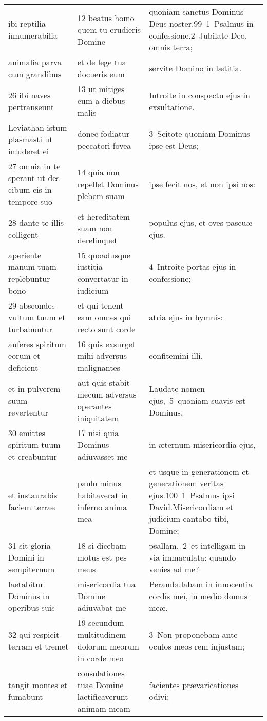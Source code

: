 \documentclass{article}
\begin{document}
\begin{longtable}{@{}p{}p{}p{}@{}}
ibi reptilia innumerabilia	&	12 beatus homo quem tu erudieris Domine	&	quoniam sanctus Dominus Deus noster.99 1 Psalmus in confessione.2 Jubilate Deo, omnis terra;	\\
animalia parva cum grandibus	&	et de lege tua docueris eum	&	servite Domino in lætitia.	\\
26 ibi naves pertranseunt	&	13 ut mitiges eum a diebus malis	&	Introite in conspectu ejus in exsultatione.	\\
Leviathan istum plasmasti ut inluderet ei	&	donec fodiatur peccatori fovea	&	3 Scitote quoniam Dominus ipse est Deus;	\\
27 omnia in te sperant ut des cibum eis in tempore suo	&	14 quia non repellet Dominus plebem suam	&	ipse fecit nos, et non ipsi nos:	\\
28 dante te illis colligent	&	et hereditatem suam non derelinquet	&	populus ejus, et oves pascuæ ejus.	\\
aperiente manum tuam replebuntur bono	&	15 quoadusque iustitia convertatur in iudicium	&	4 Introite portas ejus in confessione;	\\
29 abscondes vultum tuum et turbabuntur	&	et qui tenent eam omnes qui recto sunt corde	&	atria ejus in hymnis:	\\
auferes spiritum eorum et deficient	&	16 quis exsurget mihi adversus malignantes	&	confitemini illi.	\\
et in pulverem suum revertentur	&	aut quis stabit mecum adversus operantes iniquitatem	&	Laudate nomen ejus, 5 quoniam suavis est Dominus,	\\
30 emittes spiritum tuum et creabuntur	&	17 nisi quia Dominus adiuvasset me	&	in æternum misericordia ejus,	\\
et instaurabis faciem terrae	&	paulo minus habitaverat in inferno anima mea	&	et usque in generationem et generationem veritas ejus.100 1 Psalmus ipsi David.Misericordiam et judicium cantabo tibi, Domine;	\\
31 sit gloria Domini in sempiternum	&	18 si dicebam motus est pes meus	&	psallam, 2 et intelligam in via immaculata: quando venies ad me?	\\
laetabitur Dominus in operibus suis	&	misericordia tua Domine adiuvabat me	&	Perambulabam in innocentia cordis mei, in medio domus meæ.	\\
32 qui respicit terram et tremet	&	19 secundum multitudinem dolorum meorum in corde meo	&	3 Non proponebam ante oculos meos rem injustam;	\\
tangit montes et fumabunt	&	consolationes tuae Domine laetificaverunt animam meam	&	facientes prævaricationes odivi;	\\

\end{longtable}
\end{document}
